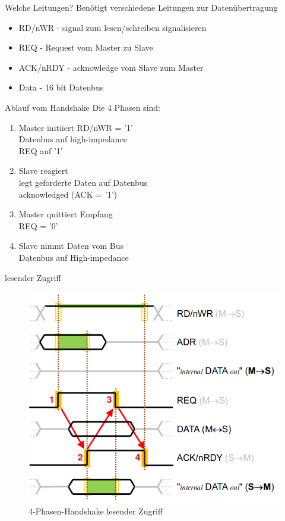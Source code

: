 \documentclass[aspectratio=169,presentation]{beamer}
\begin{document}
\begin{frame} {Welche Leitungen?}
  Benötigt verschiedene Leitungen zur Datenübertragung
  \begin{itemize}
    \item RD/nWR - signal zum lesen/schreiben signalisieren
    \item REQ - Request vom Master zu Slave
    \item ACK/nRDY - acknowledge vom Slave zum Master
    \item Data - 16 bit Datenbus
  \end{itemize}
\end{frame}


\begin{frame} {Ablauf vom Handshake}
  Die 4 Phasen sind:
  \begin{enumerate}
    \setlength\itemsep{.5cm}
    \item Master initiiert RD/nWR = '1'\\
          Datenbus auf high-impedance\\
          REQ auf '1'
    \item Slave reagiert\\
          legt geforderte Daten auf Datenbus \\
          acknowledged (ACK = '1')
    \item Master quittiert Empfang\\
          REQ = '0'
    \item Slave nimmt Daten vom Bus\\
          Datenbus auf High-impedance
  \end{enumerate}
\end{frame}


\begin{frame} {lesender Zugriff}
  \begin{figure}[ht]
    \centering
    \includegraphics[height=0.7\textheight]{figs/lesen_phase.png}
    \caption{4-Phasen-Handshake lesender Zugriff}
  \end{figure}
\end{frame}
\end{document}

